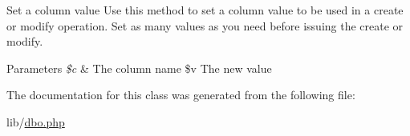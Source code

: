 Set a column value Use this method to set a column value to be used in a create or modify operation. Set as many values as you need before issuing the create or modify. 


\begin{DoxyParams}{Parameters}
{\em \$c} & The column name  \$v The new value \\
\hline
\end{DoxyParams}


The documentation for this class was generated from the following file\-:\begin{DoxyCompactItemize}
\item 
lib/\hyperlink{dbo_8php}{dbo.\-php}\end{DoxyCompactItemize}
